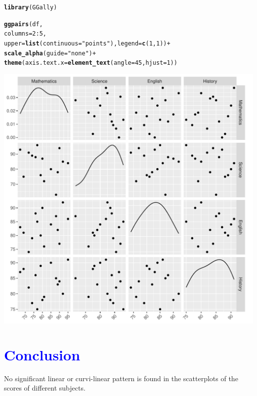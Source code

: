 \documentclass[11pt, a4paper]{article}\usepackage[]{graphicx}\usepackage[]{xcolor}
\makeatletter
\def\maxwidth{ %
  \ifdim\Gin@nat@width>\linewidth
    \linewidth
  \else
    \Gin@nat@width
  \fi
}
\newcommand{\hlnum}[1]{\textcolor[rgb]{0.686,0.059,0.569}{#1}}%
\newcommand{\hlsng}[1]{\textcolor[rgb]{0.192,0.494,0.8}{#1}}%
\newcommand{\hlopt}[1]{\textcolor[rgb]{0,0,0}{#1}}%
\newcommand{\hldef}[1]{\textcolor[rgb]{0.345,0.345,0.345}{#1}}%
\newcommand{\hlkwc}[1]{\textcolor[rgb]{0.333,0.667,0.333}{#1}}%
\newcommand{\hlkwd}[1]{\textcolor[rgb]{0.737,0.353,0.396}{\textbf{#1}}}%
\newenvironment{kframe}{%
 \def\at@end@of@kframe{}%
 \ifinner\ifhmode%
  \def\at@end@of@kframe{\end{minipage}}%
  \begin{minipage}{\columnwidth}%
 \fi\fi%
 \def\FrameCommand##1{\hskip\@totalleftmargin \hskip-\fboxsep
 \colorbox{shadecolor}{##1}\hskip-\fboxsep
     \hskip-\linewidth \hskip-\@totalleftmargin \hskip\columnwidth}%
 \MakeFramed {\advance\hsize-\width
   \@totalleftmargin\z@ \linewidth\hsize
   \@setminipage}}%
 {\par\unskip\endMakeFramed%
 \at@end@of@kframe}
\newenvironment{knitrout}{}{} %
\makeatother
\begin{document}
\begin{knitrout}
\color{fgcolor}\begin{kframe}
\begin{alltt}
\hlkwd{library}\hldef{(GGally)}
\end{alltt}
\end{kframe}
\end{knitrout}

\begin{knitrout}
\color{fgcolor}\begin{kframe}
\begin{alltt}
\hlkwd{ggpairs}\hldef{(df,}
        \hlkwc{columns} \hldef{=} \hlnum{2}\hlopt{:}\hlnum{5}\hldef{,}
        \hlkwc{upper} \hldef{=} \hlkwd{list}\hldef{(}\hlkwc{continuous} \hldef{=} \hlsng{"points"}\hldef{),} \hlkwc{legend} \hldef{=} \hlkwd{c}\hldef{(}\hlnum{1}\hldef{,}\hlnum{1}\hldef{))} \hlopt{+}
  \hlkwd{scale_alpha}\hldef{(}\hlkwc{guide} \hldef{=} \hlsng{"none"}\hldef{)} \hlopt{+}
  \hlkwd{theme}\hldef{(}\hlkwc{axis.text.x} \hldef{=} \hlkwd{element_text}\hldef{(}\hlkwc{angle} \hldef{=} \hlnum{45}\hldef{,} \hlkwc{hjust} \hldef{=} \hlnum{1}\hldef{))}
\end{alltt}
\end{kframe}
\includegraphics[width=\maxwidth]{figure/unnamed-chunk-11-1} 
\end{knitrout}



\section*{\faArrowAltCircleRight[regular] \textcolor{blue}{Conclusion}}

\smallpencil \hspace{0.1cm} {\ifr No significant linear or curvi-linear pattern is found in the scatterplots of the scores of different subjects.}
\end{document}
